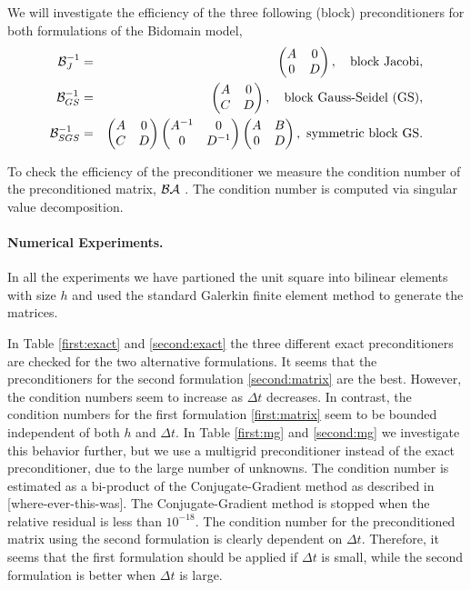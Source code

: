 \documentclass{report}
\begin{document}
We will investigate the efficiency of the three following (block) preconditioners for
both formulations of the Bidomain model,
\begin{eqnarray*}
\mathcal{B}_J^{-1} &=&
\begin{pmatrix}
A & 0\\
0 & D
\end{pmatrix}, \quad \mbox{block Jacobi}, \\
\mathcal{B}_{GS}^{-1} &=&
\begin{pmatrix}
A & 0\\
C & D
\end{pmatrix}, \quad \mbox{block Gauss-Seidel (GS)}, \\
\mathcal{B}_{SGS}^{-1} &=&
\begin{pmatrix}
A & 0\\
C & D
\end{pmatrix}
\begin{pmatrix}
A^{-1} & 0\\
0 & D^{-1}
\end{pmatrix}
\begin{pmatrix}
A & B\\
0 & D
\end{pmatrix}, \ \mbox{symmetric block GS}.
\end{eqnarray*}

To check the efficiency of the preconditioner we measure the condition
number of the preconditioned matrix, $\mathcal{B} \mathcal{A}$ .
The condition number is computed via singular value decomposition.

\paragraph{Numerical Experiments.}
In all the experiments we have partioned the unit square into
bilinear elements with size $h$ and used the standard
Galerkin finite element method to generate the matrices.

In Table \ref{first:exact} and \ref{second:exact} the three different
exact preconditioners are checked for the two alternative formulations.
It seems that the preconditioners for the second formulation \eqref{second:matrix}
are the best.
However, the condition numbers seem to increase as $\Delta t$ decreases. In contrast,
the condition numbers for the first formulation \eqref{first:matrix} seem
to be bounded independent of both $h$ and $\Delta t$.
In Table \ref{first:mg} and \ref{second:mg} we investigate this behavior further,
but we use a multigrid preconditioner instead of the exact preconditioner,
due to the large number of
unknowns. The condition number is estimated as a bi-product of the
Conjugate-Gradient method as described in [where-ever-this-was].
The Conjugate-Gradient method is stopped when the relative residual
is less than $10^{-18}$.
The condition number for the preconditioned matrix using the second formulation
is clearly dependent on $\Delta t$. Therefore, it seems that the first formulation
should be applied if $\Delta t$ is small, while the second formulation is
better when $\Delta t$
is large.
\end{document}
